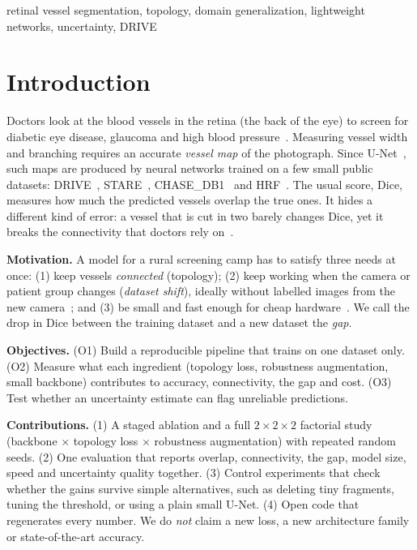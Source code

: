 \documentclass[conference]{IEEEtran}
\begin{document}
\begin{IEEEkeywords}
retinal vessel segmentation, topology, domain generalization, lightweight networks, uncertainty, DRIVE
\end{IEEEkeywords}

\section{Introduction}
Doctors look at the blood vessels in the retina (the back of the eye) to screen for diabetic eye disease, glaucoma and high blood pressure~\cite{liu2025review}. Measuring vessel width and branching requires an accurate \emph{vessel map} of the photograph. Since U-Net~\cite{ronneberger2015}, such maps are produced by neural networks trained on a few small public datasets: DRIVE~\cite{staal2004}, STARE~\cite{hoover2000}, CHASE\_DB1~\cite{fraz2012} and HRF~\cite{budai2013}. The usual score, Dice, measures how much the predicted vessels overlap the true ones. It hides a different kind of error: a vessel that is cut in two barely changes Dice, yet it breaks the connectivity that doctors rely on~\cite{shit2021,shi2024,kirchhoff2024}.

\textbf{Motivation.} A model for a rural screening camp has to satisfy three needs at once: (1) keep vessels \emph{connected} (topology); (2) keep working when the camera or patient group changes (\emph{dataset shift}), ideally without labelled images from the new camera~\cite{galdran2022,fadugba2024}; and (3) be small and fast enough for cheap hardware~\cite{sobhan2026}. We call the drop in Dice between the training dataset and a new dataset the \emph{gap}.

\textbf{Objectives.} (O1) Build a reproducible pipeline that trains on one dataset only. (O2) Measure what each ingredient (topology loss, robustness augmentation, small backbone) contributes to accuracy, connectivity, the gap and cost. (O3) Test whether an uncertainty estimate can flag unreliable predictions.

\textbf{Contributions.} (1) A staged ablation and a full $2{\times}2{\times}2$ factorial study (backbone $\times$ topology loss $\times$ robustness augmentation) with repeated random seeds. (2) One evaluation that reports overlap, connectivity, the gap, model size, speed and uncertainty quality together. (3) Control experiments that check whether the gains survive simple alternatives, such as deleting tiny fragments, tuning the threshold, or using a plain small U-Net. (4) Open code that regenerates every number. We do \emph{not} claim a new loss, a new architecture family or state-of-the-art accuracy.
\end{document}
